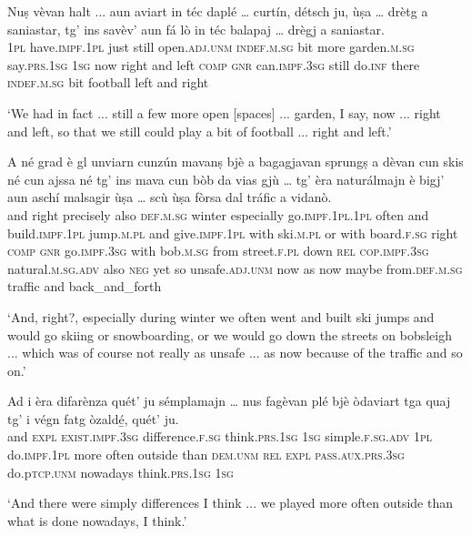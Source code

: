 \begin{linenumbers}
	\gll  Nuṣ vèvan halt ... aun aviart in téc daplé … curtín, détsch ju, ùṣa … drètg a saniastar, tg’ ins savèv’ aun fá lò in téc balapaj … drègj a saniastar.  \\
	\textsc{1pl} have.\textsc{impf.1pl} just {} still open.\textsc{adj.unm} \textsc{indef.m.sg} bit more {} garden.\textsc{m.sg} say.\textsc{prs.1sg} \textsc{1sg} now {} right and left \textsc{comp} \textsc{gnr} can.\textsc{impf.3sg} still do.\textsc{inf} there \textsc{indef.m.sg} bit football {} left and right\\
\end{linenumbers}
\medskip
\glt `We had in fact ... still a few more open [spaces] ... garden, I say, now ... right and left, so that we still could play a bit of football ... right and left.'
\medskip

\begin{linenumbers}
	\gll A né grad è gl unviarn cunzún mavanṣ bjè a bagagjavan sprungṣ a dèvan cun skis né cun ajssa né tg’ ins mava cun bòb da vias gjù … tg’ èra naturálmajn è bigj' aun aschí malsagir ùṣa … scù ùṣa fòrsa dal tráfic a vidanò.\\
	and right precisely also \textsc{def.m.sg} winter especially go.\textsc{impf.1pl.1pl} often and build.\textsc{impf.1pl} jump.\textsc{m.pl} and give.\textsc{impf.1pl} with ski.\textsc{m.pl} or with board.\textsc{f.sg} right \textsc{comp} \textsc{gnr} go.\textsc{impf.3sg} with bob.\textsc{m.sg} from street.\textsc{f.pl} down {} \textsc{rel} \textsc{cop.impf.3sg} natural.\textsc{m.sg.adv} also \textsc{neg} yet so unsafe.\textsc{adj.unm} now {} as now maybe from.\textsc{def.m.sg} traffic and back\_and\_forth\\
\end{linenumbers}   
\medskip
\glt `And, right?, especially during winter we often went and built ski jumps and would go skiing or snowboarding, or we would go down the streets on bobsleigh ... which was of course not really as unsafe ... as now because of the traffic and so on.'
\medskip

\begin{linenumbers}
	\gll Ad i èra difarènza quét’ ju sémplamajn … nus fagèvan plé bjè òdaviart tga quaj tg’ i végn fatg òzaldé̱, quét’ ju.   \\
	and \textsc{expl} \textsc{exist.impf.3sg} difference.\textsc{f.sg} think.\textsc{prs.1sg} \textsc{1sg} simple.\textsc{f.sg.adv} {} \textsc{1pl} do.\textsc{impf.1pl} more often outside than \textsc{dem.unm} \textsc{rel} \textsc{expl} \textsc{pass.aux.prs.3sg} do.p\textsc{tcp.unm} nowadays think.\textsc{prs.1sg} \textsc{1sg}\\
\end{linenumbers}
\medskip
\glt `And there were simply differences I think ... we played more often outside than what is done nowadays, I think.'
\medskip


